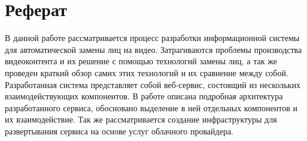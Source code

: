 \section*{Реферат}

В данной работе рассматривается процесс разработки информационной системы для автоматической замены лиц на видео. Затрагиваются проблемы производства видеоконтента и их решение с помощью технологий замены лиц, а так же проведен краткий обзор самих этих технологий и их сравнение между собой. Разработанная система представляет собой веб-сервис, состоящий из нескольких взаимодействующих компонентов. В работе описана подробная архитектура разработанного сервиса, обосновано выделение в ней отдельных компонентов и их взаимодействие. Так же рассматривается создание инфраструктуры для развертывания сервиса на основе услуг облачного провайдера.